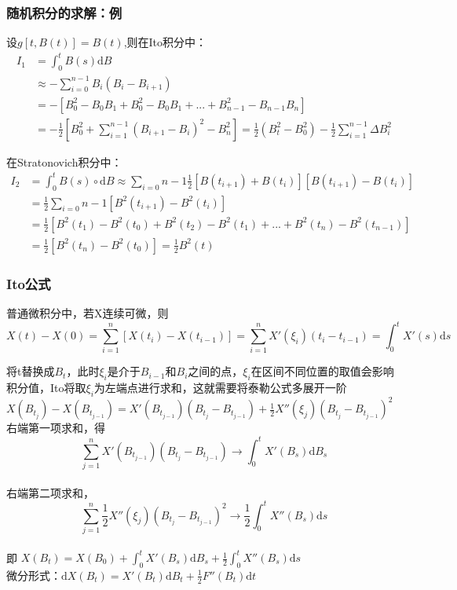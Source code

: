 \begin{frame}

\frametitle{随机积分的求解：例}
\footnotesize
设$g[t,B(t)]=B(t)$,则在Ito积分中：
\begin{align}
I_1 &= \int_0^t B(s)\mathrm{d}B \\ 
&\approx -\sum_{i=0}^{n-1}B_i(B_i-B_{i+1}) \\
&=-[B_0^2-B_0B_1+B_0^2-B_0B_1+...+B_{n-1}^2-B_{n-1}B_n] \\
&=-\frac{1}{2}[B_0^2+\sum_{i=1}^{n-1}(B_{i+1}-B_i)^2-B_n^2]=\frac{1}{2}(B_t^2-B_0^2)-\frac{1}{2}\sum_{i=1}^{n-1}\Delta B_i^2
\end{align}

在Stratonovich积分中：
\begin{align}
I_2 &= \int_0^t B(s)∘\mathrm{d}B \approx \sum_{i=0}{n-1}\frac{1}{2}[B(t_{i+1})+B(t_i)][B(t_{i+1})-B(t_i)]\\
&= \frac{1}{2}\sum_{i=0}{n-1}[B^2(t_{i+1})-B^2(t_i)]\\
&= \frac{1}{2}[B^2(t_1)-B^2(t_0)+B^2(t_2)-B^2(t_1)+...+B^2(t_n)-B^2(t_{n-1})]\\
&= \frac{1}{2}[B^2(t_n)-B^2(t_0)] = \frac{1}{2}B^2(t)
\end{align}

\end{frame}

\begin{frame}

\frametitle{Ito公式}
\footnotesize

普通微积分中，若X连续可微，则$$X(t)-X(0)=\sum_{i=1}^n[X(t_i)-X(t_{i-1})]=\sum_{i=1}^nX'({\xi}_i)(t_i-t_{i-1})=\int_0^t X'(s)\mathrm{d}s$$

将t替换成$B_t$，此时$\xi_i$是介于$B_{i-1}$和$B_i$之间的点，$\xi_i$在区间不同位置的取值会影响积分值，Ito将取${\xi_i}$为左端点进行求和，这就需要将泰勒公式多展开一阶
$X(B_{t_j})-X(B_{t_{j-1}}) = X'(B_{t_{j-1}})(B_{t_j}-B_{t_{j-1}})+\frac{1}{2}X''(\xi_j)(B_{t_j}-B_{t_{j-1}})^2$\\
右端第一项求和，得$$\sum_{j=1}^nX'(B_{t_{j-1}})(B_{t_j}-B_{t_{j-1}}) \rightarrow \int_0^tX'(B_s)\mathrm{d}B_s$$\\
右端第二项求和，$$\sum_{j=1}^n\frac{1}{2}X''(\xi_j)(B_{t_j}-B_{t_{j-1}})^2 \rightarrow \frac{1}{2}\int_0^tX''(B_s)\mathrm{d}s$$\\
即 $X(B_t) = X(B_0) + \int_0^tX'(B_s)\mathrm{d}B_s + \frac{1}{2}\int_0^tX''(B_s)\mathrm{d}s$\\
微分形式：$\mathrm{d}X(B_t) = X'(B_t)\mathrm{d}B_t + \frac{1}{2}F''(B_t)\mathrm{d}t$

\end{frame}

